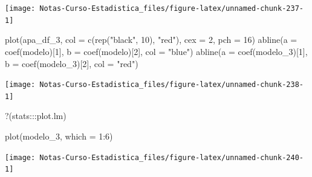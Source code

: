 \documentclass[
  12pt,
]{book}
\newenvironment{Shaded}{\begin{snugshade}}{\end{snugshade}}
\newcommand{\AttributeTok}[1]{\textcolor[rgb]{0.77,0.63,0.00}{#1}}
\newcommand{\DecValTok}[1]{\textcolor[rgb]{0.00,0.00,0.81}{#1}}
\newcommand{\FunctionTok}[1]{\textcolor[rgb]{0.00,0.00,0.00}{#1}}
\newcommand{\NormalTok}[1]{#1}
\newcommand{\SpecialCharTok}[1]{\textcolor[rgb]{0.00,0.00,0.00}{#1}}
\newcommand{\StringTok}[1]{\textcolor[rgb]{0.31,0.60,0.02}{#1}}
\theoremstyle{definition}
\theoremstyle{definition}
\theoremstyle{definition}
\theoremstyle{remark}
\begin{document}
\begin{center}\texttt{[image: Notas-Curso-Estadistica\_files/figure-latex/unnamed-chunk-237-1]} \end{center}

\begin{Shaded}
\begin{Highlighting}[]
\FunctionTok{plot}\NormalTok{(apa\_df\_3, }\AttributeTok{col =} \FunctionTok{c}\NormalTok{(}\FunctionTok{rep}\NormalTok{(}\StringTok{"black"}\NormalTok{, }\DecValTok{10}\NormalTok{), }\StringTok{"red"}\NormalTok{), }\AttributeTok{cex =} \DecValTok{2}\NormalTok{, }
    \AttributeTok{pch =} \DecValTok{16}\NormalTok{)}
\FunctionTok{abline}\NormalTok{(}\AttributeTok{a =} \FunctionTok{coef}\NormalTok{(modelo)[}\DecValTok{1}\NormalTok{], }\AttributeTok{b =} \FunctionTok{coef}\NormalTok{(modelo)[}\DecValTok{2}\NormalTok{], }\AttributeTok{col =} \StringTok{"blue"}\NormalTok{)}
\FunctionTok{abline}\NormalTok{(}\AttributeTok{a =} \FunctionTok{coef}\NormalTok{(modelo\_3)[}\DecValTok{1}\NormalTok{], }\AttributeTok{b =} \FunctionTok{coef}\NormalTok{(modelo\_3)[}\DecValTok{2}\NormalTok{], }
    \AttributeTok{col =} \StringTok{"red"}\NormalTok{)}
\end{Highlighting}
\end{Shaded}

\begin{center}\texttt{[image: Notas-Curso-Estadistica\_files/figure-latex/unnamed-chunk-238-1]} \end{center}

\begin{Shaded}
\begin{Highlighting}[]
\StringTok{\textasciigrave{}}\AttributeTok{?}\StringTok{\textasciigrave{}}\NormalTok{(stats}\SpecialCharTok{:::}\NormalTok{plot.lm)}
\end{Highlighting}
\end{Shaded}

\begin{Shaded}
\begin{Highlighting}[]
\FunctionTok{plot}\NormalTok{(modelo\_3, }\AttributeTok{which =} \DecValTok{1}\SpecialCharTok{:}\DecValTok{6}\NormalTok{)}
\end{Highlighting}
\end{Shaded}

\begin{center}\texttt{[image: Notas-Curso-Estadistica\_files/figure-latex/unnamed-chunk-240-1]} \end{center}
\end{document}
